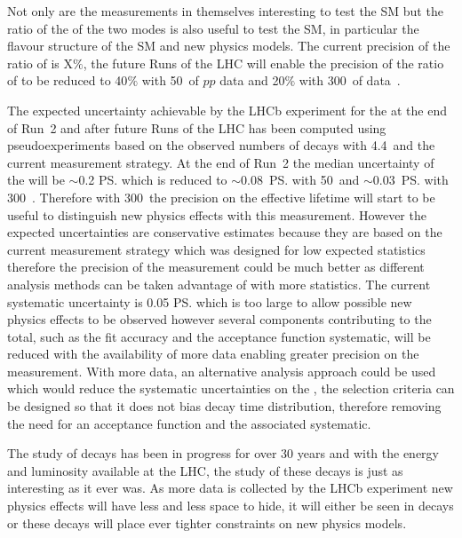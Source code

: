 Not only are the \BF measurements in themselves interesting to test the SM but the ratio of the \BFs of the two modes is also useful to test the SM, in particular the flavour structure of the SM and new physics models. The current precision of the ratio of \BFs is X$\%$, the future Runs of the LHC will enable the precision of the ratio of \BFs to be reduced to 40$\%$ with 50~\fb of $pp$ data and 20$\%$ with 300~\fb of data~\cite{Aaij:2244311}. 

The expected uncertainty achievable by the LHCb experiment for the \el at the end of Run~2 and after future Runs of the LHC has been computed using pseudoexperiments based on the observed numbers of decays with 4.4~\fb and the current measurement strategy. At the end of Run~2 the median uncertainty of the \el will be $\sim$0.2 \ps which is reduced to $\sim$0.08~\ps with 50~\fb and $\sim$0.03~\ps with 300~\fb. Therefore with 300~\fb the precision on the effective lifetime will start to be useful to distinguish new physics effects with this measurement. However the expected uncertainties are conservative estimates because they are based on the current measurement strategy which was designed for low expected statistics therefore the precision of the measurement could be much better as different analysis methods can be taken advantage of with more statistics. 
The current systematic uncertainty is 0.05 \ps which is too large to allow possible new physics effects to be observed however several components contributing to the total, such as the fit accuracy and the acceptance function systematic, will be reduced with the availability of more data enabling greater precision on the measurement. With more data, an alternative analysis approach could be used which would reduce the systematic uncertainties on the \el, the selection criteria can be designed so that it does not bias \bsmumu decay time distribution, therefore removing the need for an acceptance function and the associated systematic.


The study of \bmumu decays has been in progress for over 30 years and with the energy and luminosity available at the LHC, the study of these decays is just as interesting as it ever was. As more data is collected by the LHCb experiment new physics effects will have less and less space to hide, it will either be seen in \bmumu decays or these decays will place ever tighter constraints on new physics models. 
